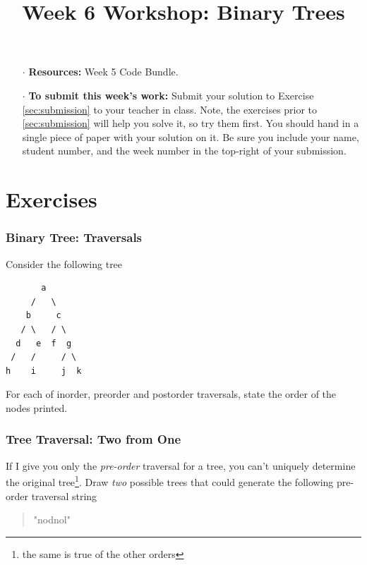 \documentclass[twoside=false,DIV=14]{scrartcl}
\title{\color{redish} \vspace{-2em}Week 6 Workshop: Binary Trees}
\begin{document}
{\color{blackish}\maketitle}\vspace{-2em}%
\begin{itemize}
    \item[$\cdot$] {\bf Resources:}  Week 5  Code Bundle.
    \item[$\cdot$] {\bf To submit this week's work:} Submit your solution to Exercise \ref{sec:submission} to your teacher in class.  Note, the exercises prior to \ref{sec:submission} will help you solve it, so try them first.  You should hand in a single piece of paper with your solution on it.  Be sure you include your name, student number, and the week number in the top-right of your submission.
\end{itemize}

\part*{Exercises}

\section{Binary Tree: Traversals}
Consider the following tree


    
\begin{verbatim}
       a
     /   \
    b     c
   / \   / \
  d   e  f  g
 /   /     / \
h    i     j  k 
\end{verbatim}
            
For each of inorder, preorder and postorder traversals, state the order of the nodes printed. 

\section{Tree Traversal: Two from One}

If I give you only the \emph{pre-order} traversal for a tree, you can't uniquely determine the original tree\footnote{the same is true of the other orders}.  Draw \emph{two} possible trees that could generate the following pre-order traversal string
\begin{quote}
"nodnol"
\end{quote}
    
\end{document}
